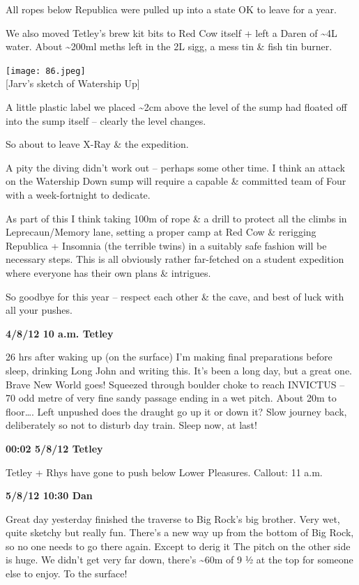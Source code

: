 All ropes below Republica were pulled up into a state OK to leave for a
year.

We also moved Tetley's brew kit bits to Red Cow itself + left a Daren of
\textasciitilde{}4L water. About \textasciitilde{}200ml meths left in
the 2L sigg, a mess tin \& fish tin burner.

\texttt{[image: 86.jpeg]}\\
{[}Jarv's sketch of Watership Up{]}

A little plastic label we placed \textasciitilde{}2cm above the level of
the sump had floated off into the sump itself -- clearly the level
changes.

So about to leave X-Ray \& the expedition.

A pity the diving didn't work out -- perhaps some other time. I think an
attack on the Watership Down sump will require a capable \& committed
team of Four with a week-fortnight to dedicate.

As part of this I think taking 100m of rope \& a drill to protect all
the climbs in Leprecaun/Memory lane, setting a proper camp at Red Cow \&
rerigging Republica + Insomnia (the terrible twins) in a suitably safe
fashion will be necessary steps. This is all obviously rather
far-fetched on a student expedition where everyone has their own plans
\& intrigues.

So goodbye for this year -- respect each other \& the cave, and best of
luck with all your pushes.

\textbf{4/8/12 10 a.m. Tetley}

26 hrs after waking up (on the surface) I'm making final preparations
before sleep, drinking Long John and writing this. It's been a long day,
but a great one. Brave New World goes! Squeezed through boulder choke to
reach INVICTUS -- 70 odd metre of very fine sandy passage ending in a
wet pitch. About 20m to floor\ldots{}. Left unpushed does the draught go
up it or down it? Slow journey back, deliberately so not to disturb day
train. Sleep now, at last!

\textbf{00:02 5/8/12 Tetley}

Tetley + Rhys have gone to push below Lower Pleasures. Callout: 11 a.m.

\textbf{5/8/12 10:30 Dan}

Great day yesterday finished the traverse to Big Rock's big brother.
Very wet, quite sketchy but really fun. There's a new way up from the
bottom of Big Rock, so no one needs to go there again. Except to derig
it The pitch on the other side is huge. We didn't get very far down,
there's \textasciitilde{}60m of 9 ½ at the top for someone else to
enjoy. To the surface!

